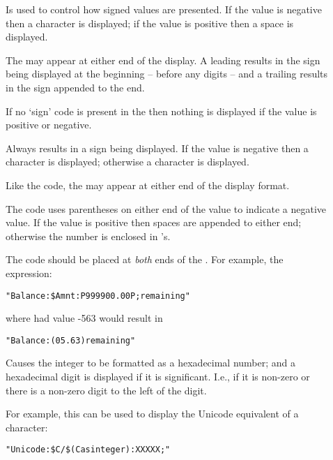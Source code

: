 \begin{description}
\item[\q{-}] Is used to control how signed values are presented. If the value is negative then a \q{-} character is displayed; if the value is positive then a space is displayed.

\begin{aside}
The \q{-}  may appear at either end of the display. A leading \q{-} results in the sign being displayed at the beginning -- before any digits -- and a trailing \q{-} results in the sign appended to the end.
\end{aside}

\begin{aside}
\begin{aside}
If no `sign' code is present in the  then nothing is displayed if the value is positive or negative.
\end{aside}
\end{aside}

\item[\q{+}] Always results in a sign being displayed. If the value is negative then a \q{-} character is displayed; otherwise a \q{+} character is displayed.

Like the \q{-} code, the \q{+} may appear at either end of the display format.

\item[] The  code uses parentheses on either end of the value to indicate a negative value. If the value is positive then spaces are appended to either end; otherwise the number is enclosed in \q{()}'s.

\begin{aside}
The  code should be placed at \emph{both} ends of the .
For example, the expression:
\begin{alltt}
"Balance: \$Amnt:P999900.00P; remaining"
\end{alltt}
where  had value -563 would result in
\begin{alltt}
"Balance: (05.63) remaining"
\end{alltt}
\end{aside}
\item[] Causes the integer to be formatted as a hexadecimal number; and a hexadecimal digit is displayed if it is significant. I.e., if it is non-zero or there is a non-zero digit to the left of the digit.

For example, this can be used to display the Unicode equivalent of a character:
\begin{alltt}
"Unicode: \$C/\$(C as integer):XXXXX;"
\end{alltt}

\end{description}

